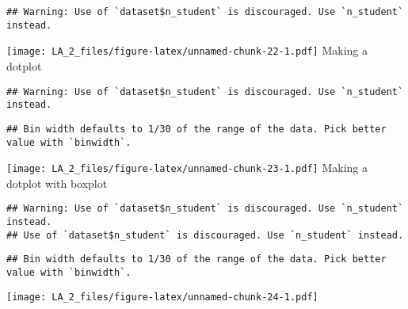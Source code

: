 \documentclass[
]{article}
\newenvironment{Shaded}{\begin{snugshade}}{\end{snugshade}}
\newcommand{\AttributeTok}[1]{\textcolor[rgb]{0.77,0.63,0.00}{#1}}
\newcommand{\ConstantTok}[1]{\textcolor[rgb]{0.00,0.00,0.00}{#1}}
\newcommand{\DecValTok}[1]{\textcolor[rgb]{0.00,0.00,0.81}{#1}}
\newcommand{\FunctionTok}[1]{\textcolor[rgb]{0.00,0.00,0.00}{#1}}
\newcommand{\NormalTok}[1]{#1}
\newcommand{\SpecialCharTok}[1]{\textcolor[rgb]{0.00,0.00,0.00}{#1}}
\begin{document}
\begin{verbatim}
## Warning: Use of `dataset$n_student` is discouraged. Use `n_student` instead.
\end{verbatim}

\texttt{[image: LA\_2\_files/figure-latex/unnamed-chunk-22-1.pdf]} Making
a dotplot

\begin{Shaded}
\end{Shaded}

\begin{verbatim}
## Warning: Use of `dataset$n_student` is discouraged. Use `n_student` instead.
\end{verbatim}

\begin{verbatim}
## Bin width defaults to 1/30 of the range of the data. Pick better value with `binwidth`.
\end{verbatim}

\texttt{[image: LA\_2\_files/figure-latex/unnamed-chunk-23-1.pdf]} Making
a dotplot with boxplot

\begin{Shaded}
\end{Shaded}

\begin{verbatim}
## Warning: Use of `dataset$n_student` is discouraged. Use `n_student` instead.
## Use of `dataset$n_student` is discouraged. Use `n_student` instead.
\end{verbatim}

\begin{verbatim}
## Bin width defaults to 1/30 of the range of the data. Pick better value with `binwidth`.
\end{verbatim}

\texttt{[image: LA\_2\_files/figure-latex/unnamed-chunk-24-1.pdf]}
\end{document}
